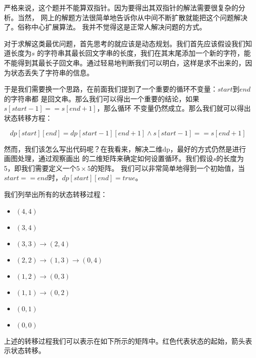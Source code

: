 \documentclass[../../main.tex]{subfiles}
\begin{document}
严格来说，这个题并不能算双指针。因为要得出其双指针的解法需要很复杂的分析。当然，
网上的解题方法很简单地告诉你从中间不断扩散就能把这个问题解决了。俗称中心扩展算法。
我并不觉得这是正常人解决问题的方式。

对于求解这类最优问题，首先思考的就应该是动态规划。我们首先应该假设我们知道长度为$s$
的字符串其最长回文字串的长度，我们在其末尾添加一个新的字符，能不能得到其最长子回文串。通过轻易地判断我们可以明白，这样是求不出来的，因为状态丢失了字符串的信息。

于是我们需要换一个思路，在前面我们提到了一个重要的循环不变量：$start$到$end$的字符串都
是回文串。那么我们可以得出一个重要的结论，如果$s[start - 1] == s[end + 1]$，那么循环
不变量仍然成立。那么我们就可以得出状态转移方程：

$$
dp[start][end] = dp[start - 1][end + 1] \land s[start - 1] == s[end + 1]
$$

然而，我们该怎么写出代码呢？在我看来，解决二维dp，最好的方式仍然是进行画图处理，通过观察画出
的二维矩阵来确定如何设置循环。我们假设$s$的长度为5，即我们需要定义一个$5 \times 5$的矩阵。
我们可以非常简单地得到一个初始值，当$start == end$时，$dp[start][end] = true$。

我们列举出所有的状态转移过程：

\begin{itemize}
  \item $(4,4)$
  \item $(3,4)$
  \item $(3,3) \rightarrow (2, 4)$
  \item $(2,2) \rightarrow (1, 3) \rightarrow (0, 4)$
  \item $(1,2) \rightarrow (0, 3)$
  \item $(1,1) \rightarrow (0,2)$
  \item $(0,1)$
  \item $(0,0)$
\end{itemize}

上述的转移过程我们可以表示在如下所示的矩阵中。红色代表状态的起始，箭头表示状态转移。
\end{document}
